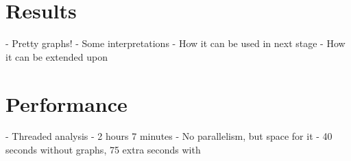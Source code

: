 \section{Results}
- Pretty graphs!
- Some interpretations
- How it can be used in next stage
- How it can be extended upon

\section{Performance}
- Threaded analysis
- 2 hours 7 minutes
- No parallelism, but space for it
- 40 seconds without graphs, 75 extra seconds with




